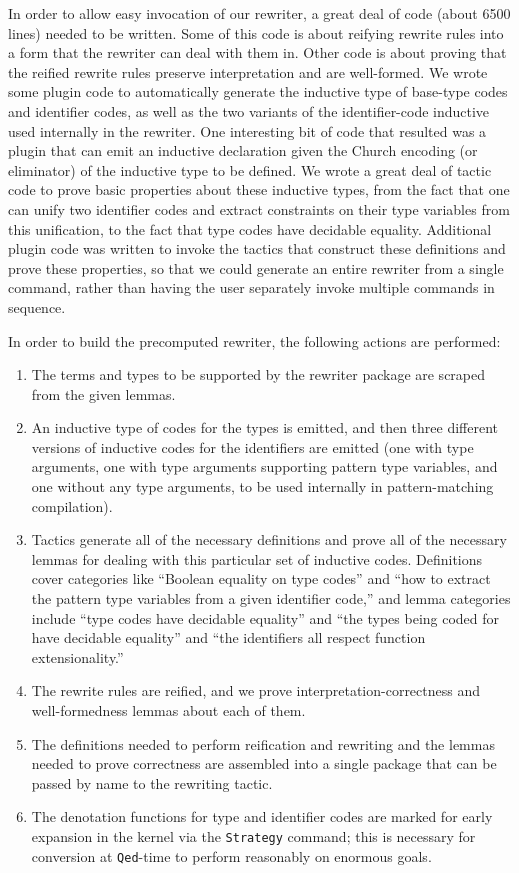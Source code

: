 \documentclass[sigplan,10pt,review,anonymous]{acmart}\settopmatter{printfolios=true,printccs=false,printacmref=false}
\begin{document}
In order to allow easy invocation of our rewriter, a great deal of code (about 6500 lines) needed to be written.
Some of this code is about reifying rewrite rules into a form that the rewriter can deal with them in.
Other code is about proving that the reified rewrite rules preserve interpretation and are well-formed.
We wrote some plugin code to automatically generate the inductive type of base-type codes and identifier codes, as well as the two variants of the identifier-code inductive used internally in the rewriter.
One interesting bit of code that resulted was a plugin that can emit an inductive declaration given the Church encoding (or eliminator) of the inductive type to be defined.
We wrote a great deal of tactic code to prove basic properties about these inductive types, from the fact that one can unify two identifier codes and extract constraints on their type variables from this unification, to the fact that type codes have decidable equality.
Additional plugin code was written to invoke the tactics that construct these definitions and prove these properties, so that we could generate an entire rewriter from a single command, rather than having the user separately invoke multiple commands in sequence.

In order to build the precomputed rewriter, the following actions are performed:
\begin{enumerate}
    \item
    The terms and types to be supported by the rewriter package are scraped from the given lemmas.
    \item
    An inductive type of codes for the types is emitted, and then three different versions of inductive codes for the identifiers are emitted (one with type arguments, one with type arguments supporting pattern type variables, and one without any type arguments, to be used internally in pattern-matching compilation).
    \item
    Tactics generate all of the necessary definitions and prove all of the necessary lemmas for dealing with this particular set of inductive codes.
    Definitions cover categories like ``Boolean equality on type codes'' and ``how to extract the pattern type variables from a given identifier code,'' and lemma categories include ``type codes have decidable equality'' and ``the types being coded for have decidable equality'' and ``the identifiers all respect function extensionality.''
    \item
    The rewrite rules are reified, and we prove interpretation-correctness and well-formedness lemmas about each of them.
    \item
    The definitions needed to perform reification and rewriting and the lemmas needed to prove correctness are assembled into a single package that can be passed by name to the rewriting tactic.
    \item
    The denotation functions for type and identifier codes are marked for early expansion in the kernel via the \texttt{Strategy} command;
    this is necessary for conversion at \texttt{Qed}-time to perform reasonably on enormous goals.
\end{enumerate}
\end{document}
